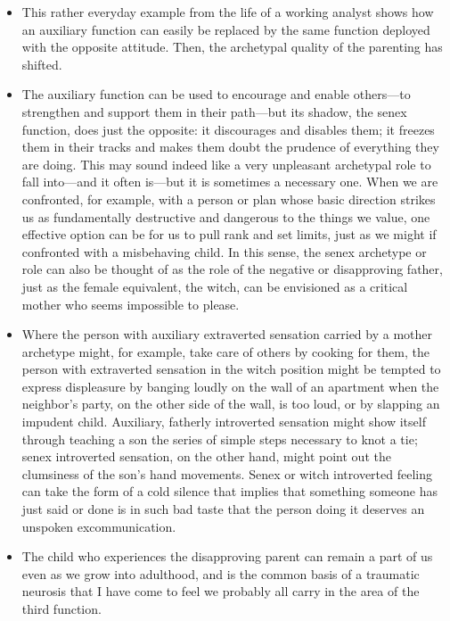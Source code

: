 \begin{itemize}
\item This rather everyday example from the life of a working analyst shows how
an auxiliary function can easily be replaced by the same function deployed with
the opposite attitude. Then, the archetypal quality of the parenting has
shifted.

\item The auxiliary function can be used to encourage and enable others—to
strengthen and support them in their path—but its shadow, the senex function,
does just the opposite: it discourages and disables them; it freezes them in
their tracks and makes them doubt the prudence of everything they are doing.
This may sound indeed like a very unpleasant archetypal role to fall into—and
it often is—but it is sometimes a necessary one. When we are confronted, for
example, with a person or plan whose basic direction strikes us as
fundamentally destructive and dangerous to the things we value, one effective
option can be for us to pull rank and set limits, just as we might if
confronted with a misbehaving child. In this sense, the senex archetype or role
can also be thought of as the role of the negative or disapproving father, just
as the female equivalent, the witch, can be envisioned as a critical mother who
seems impossible to please.

\item Where the person with auxiliary extraverted sensation carried by a mother
archetype might, for example, take care of others by cooking for them, the
person with extraverted sensation in the witch position might be tempted to
express displeasure by banging loudly on the wall of an apartment when the
neighbor’s party, on the other side of the wall, is too loud, or by slapping an
impudent child. Auxiliary, fatherly introverted sensation might show itself
through teaching a son the series of simple steps necessary to knot a tie;
senex introverted sensation, on the other hand, might point out the clumsiness
of the son’s hand movements. Senex or witch introverted feeling can take the
form of a cold silence that implies that something someone has just said or
done is in such bad taste that the person doing it deserves an unspoken
excommunication.

\item The child who experiences the disapproving parent can remain a part of us
even as we grow into adulthood, and is the common basis of a traumatic neurosis
that I have come to feel we probably all carry in the area of the third
function.


\end{itemize}
